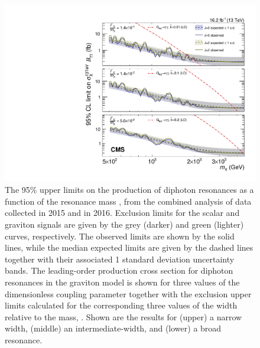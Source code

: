 \begin{figure}[!htb]
    \centering
    \includegraphics[width=\cmsFigMedWidth]{Figure_004.pdf}
    \caption{
     The 95\% \CL upper limits on the production of diphoton resonances as a
      function of the resonance mass \mX, from the combined analysis of data collected
      in 2015 and in 2016.
      Exclusion limits for the scalar and \RS graviton signals are given by the grey (darker) and
      green (lighter) curves, respectively.  The observed limits are shown by the solid lines,
      while the median expected limits are given by the dashed lines together with their
      associated 1 standard deviation uncertainty bands.  The leading-order production cross
      section for diphoton resonances in the \RS graviton model is shown for three values of the
      dimensionless coupling parameter \ktild together with the exclusion upper limits
      calculated for the corresponding three values of the width relative to the mass, \GammaOm.
      Shown are the results for (upper) a narrow width, (middle) an intermediate-width, and
      (lower) a broad resonance.
      \label{fig:limits:13TeV}
    }
\end{figure}

